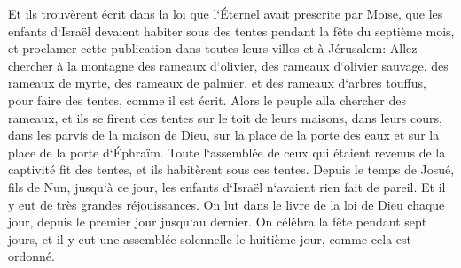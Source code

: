 \verse Et ils trouvèrent écrit dans la loi que l`Éternel avait prescrite par Moïse, que les enfants d`Israël devaient habiter sous des tentes pendant la fête du septième mois, 
\verse et proclamer cette publication dans toutes leurs villes et à Jérusalem: Allez chercher à la montagne des rameaux d`olivier, des rameaux d`olivier sauvage, des rameaux de myrte, des rameaux de palmier, et des rameaux d`arbres touffus, pour faire des tentes, comme il est écrit. 
\verse Alors le peuple alla chercher des rameaux, et ils se firent des tentes sur le toit de leurs maisons, dans leurs cours, dans les parvis de la maison de Dieu, sur la place de la porte des eaux et sur la place de la porte d`Éphraïm. 
\verse Toute l`assemblée de ceux qui étaient revenus de la captivité fit des tentes, et ils habitèrent sous ces tentes. Depuis le temps de Josué, fils de Nun, jusqu`à ce jour, les enfants d`Israël n`avaient rien fait de pareil. Et il y eut de très grandes réjouissances. 
\verse On lut dans le livre de la loi de Dieu chaque jour, depuis le premier jour jusqu`au dernier. On célébra la fête pendant sept jours, et il y eut une assemblée solennelle le huitième jour, comme cela est ordonné. 

\chapter{}

